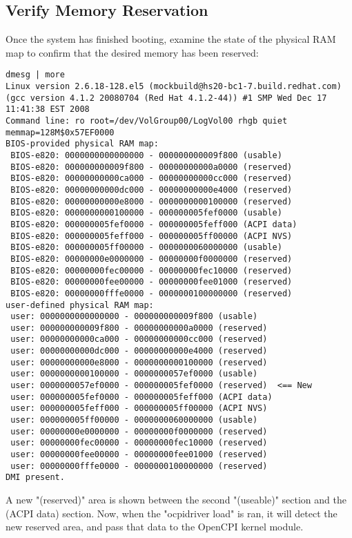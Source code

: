 \begin{flushleft}
\subsection{Verify Memory Reservation}
Once the system has finished booting, examine the state of the physical RAM map to confirm that the desired memory has been reserved:\\
\bigskip
\begin{lstlisting}
dmesg | more
Linux version 2.6.18-128.el5 (mockbuild@hs20-bc1-7.build.redhat.com) (gcc version 4.1.2 20080704 (Red Hat 4.1.2-44)) #1 SMP Wed Dec 17 11:41:38 EST 2008
Command line: ro root=/dev/VolGroup00/LogVol00 rhgb quiet memmap=128M$0x57EF0000
BIOS-provided physical RAM map:
 BIOS-e820: 0000000000000000 - 000000000009f800 (usable)
 BIOS-e820: 000000000009f800 - 00000000000a0000 (reserved)
 BIOS-e820: 00000000000ca000 - 00000000000cc000 (reserved)
 BIOS-e820: 00000000000dc000 - 00000000000e4000 (reserved)
 BIOS-e820: 00000000000e8000 - 0000000000100000 (reserved)
 BIOS-e820: 0000000000100000 - 000000005fef0000 (usable)
 BIOS-e820: 000000005fef0000 - 000000005feff000 (ACPI data)
 BIOS-e820: 000000005feff000 - 000000005ff00000 (ACPI NVS)
 BIOS-e820: 000000005ff00000 - 0000000060000000 (usable)
 BIOS-e820: 00000000e0000000 - 00000000f0000000 (reserved)
 BIOS-e820: 00000000fec00000 - 00000000fec10000 (reserved)
 BIOS-e820: 00000000fee00000 - 00000000fee01000 (reserved)
 BIOS-e820: 00000000fffe0000 - 0000000100000000 (reserved)
user-defined physical RAM map:
 user: 0000000000000000 - 000000000009f800 (usable)
 user: 000000000009f800 - 00000000000a0000 (reserved)
 user: 00000000000ca000 - 00000000000cc000 (reserved)
 user: 00000000000dc000 - 00000000000e4000 (reserved)
 user: 00000000000e8000 - 0000000000100000 (reserved)
 user: 0000000000100000 - 0000000057ef0000 (usable)
 user: 0000000057ef0000 - 000000005fef0000 (reserved)  <== New
 user: 000000005fef0000 - 000000005feff000 (ACPI data)
 user: 000000005feff000 - 000000005ff00000 (ACPI NVS)
 user: 000000005ff00000 - 0000000060000000 (usable)
 user: 00000000e0000000 - 00000000f0000000 (reserved)
 user: 00000000fec00000 - 00000000fec10000 (reserved)
 user: 00000000fee00000 - 00000000fee01000 (reserved)
 user: 00000000fffe0000 - 0000000100000000 (reserved)
DMI present.
\end{lstlisting}

A new "(reserved)" area is shown between the second "(useable)" section and the (ACPI data) section. Now, when the "ocpidriver load" is ran, it will detect the new reserved area, and pass that data to the OpenCPI kernel module. \\
\end{flushleft}
